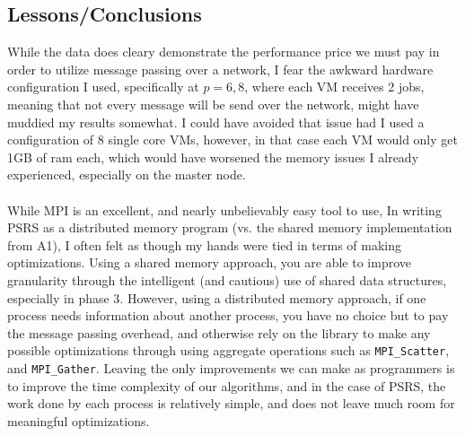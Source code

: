 \documentclass[11pt]{report}
\begin{document}
\subsection*{Lessons/Conclusions}
While the data does cleary demonstrate the performance price we must pay in order to utilize message
passing over a network, I fear the awkward hardware configuration I used, specifically at $p=6,8$, where each VM receives 2 jobs, meaning that not every message will be send over the network, might have muddied
my results somewhat. I could have avoided that issue had I used a configuration of 8 single core VMs, however, in that case each VM would only get 1GB of ram each, which would have worsened the memory issues
I already experienced, especially on the master node.\\\\
While MPI is an excellent, and nearly unbelievably easy tool to use, In writing PSRS as a distributed memory program (vs. the shared memory implementation from A1), I often felt as though my hands were tied in terms of making optimizations. Using a shared memory approach, you are able to improve granularity through the intelligent (and cautious) use of shared data structures, especially in phase 3. However, using a distributed memory approach, if one process needs information about another process, you have no choice but to pay the message passing overhead, and otherwise rely on the library to make any possible optimizations through using aggregate operations such as \verb|MPI_Scatter|, and \verb|MPI_Gather|. Leaving the only improvements we can make as programmers is to improve the time complexity of our algorithms, and in the case of PSRS, the work done by each process is relatively simple, and does not leave much room for meaningful optimizations.
\end{document}
